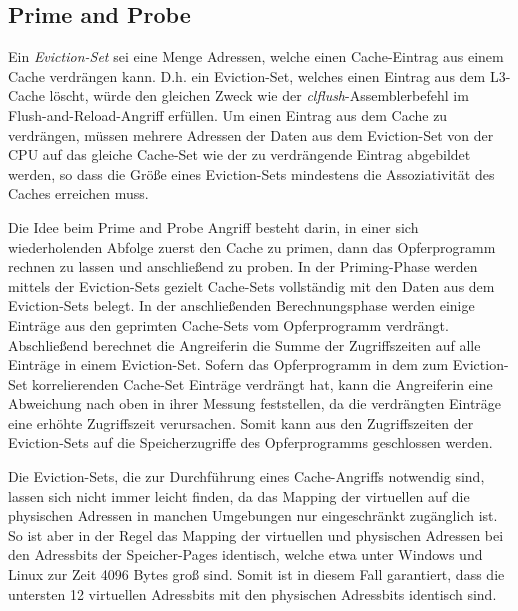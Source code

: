\subsection{Prime and Probe}

Ein \textit{Eviction-Set} sei eine Menge Adressen, welche einen Cache-Eintrag aus einem Cache verdrängen kann. D.h. ein Eviction-Set, welches einen Eintrag aus dem L3-Cache löscht, würde den gleichen Zweck wie der \textit {clflush}-Assemblerbefehl im Flush-and-Reload-Angriff erfüllen. 
Um einen Eintrag aus dem Cache zu verdrängen, müssen mehrere Adressen der Daten aus dem Eviction-Set von der CPU auf das gleiche Cache-Set wie der zu verdrängende Eintrag abgebildet werden, so dass die Größe eines Eviction-Sets mindestens die Assoziativität des Caches erreichen muss.

Die Idee beim Prime and Probe Angriff besteht darin, in einer sich wiederholenden Abfolge zuerst den Cache zu primen, dann das Opferprogramm rechnen zu lassen und anschließend zu proben.
In der Priming-Phase werden mittels der Eviction-Sets gezielt Cache-Sets vollständig mit den Daten aus dem Eviction-Sets belegt.
In der anschließenden Berechnungsphase werden einige Einträge aus den geprimten Cache-Sets vom Opferprogramm verdrängt. Abschließend berechnet die Angreiferin die Summe der Zugriffszeiten auf alle Einträge in einem Eviction-Set.
Sofern das Opferprogramm in dem zum Eviction-Set korrelierenden Cache-Set Einträge verdrängt hat, kann die Angreiferin eine Abweichung nach oben in ihrer Messung feststellen, da die verdrängten Einträge eine erhöhte Zugriffszeit verursachen. Somit kann aus den Zugriffszeiten der Eviction-Sets auf die Speicherzugriffe des Opferprogramms geschlossen werden.

Die Eviction-Sets, die zur Durchführung eines Cache-Angriffs notwendig sind, lassen sich nicht immer leicht finden, da das Mapping der virtuellen auf die physischen Adressen in manchen Umgebungen nur eingeschränkt zugänglich ist.
So ist aber in der Regel das Mapping der virtuellen und physischen Adressen bei den Adressbits der Speicher-Pages identisch, welche etwa unter Windows und Linux zur Zeit 4096 Bytes groß sind. Somit ist in diesem Fall garantiert, dass die untersten 12 virtuellen Adressbits mit den physischen Adressbits identisch sind. 


